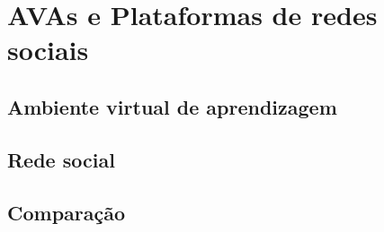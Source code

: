 \chapter{AVAs e Plataformas de redes sociais}
\label{avas-redes-sociais}

\section{Ambiente virtual de aprendizagem}
\label{ava}

\section{Rede social}
\label{rede-social}

\section{Comparação}
\label{comparacao-ava}


